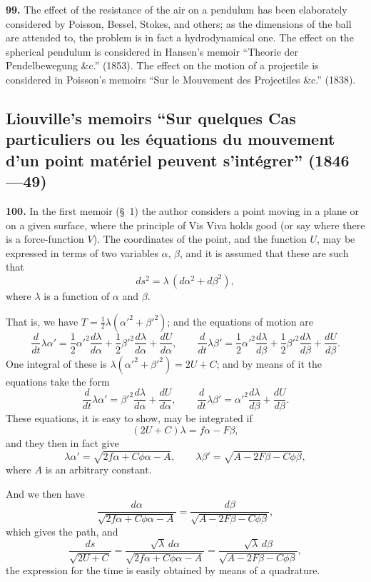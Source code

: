 \documentclass[11pt,a4paper]{book}
\begin{document}
\textbf{99.} The effect of the resistance of the air on a pendulum has been elaborately considered by Poisson, Bessel, Stokes, and others; as the dimensions of the ball are attended to, the problem is in fact a hydrodynamical one. The effect on the spherical pendulum is considered in Hansen's memoir ``Theorie der Pendelbewegung \&c.'' (1853). The effect on the motion of a projectile is considered in Poisson's memoirs ``Sur le Mouvement des Projectiles \&c.'' (1838).

\subsection*{Liouville's memoirs ``Sur quelques Cas particuliers ou les \'equations du mouvement d'un point mat\'eriel peuvent s'int\'egrer'' (1846---49)}

\textbf{100.} In the first memoir (\S~1) the author considers a point moving in a plane or on a given surface, where the principle of Vis Viva holds good (or say where there is a force-function $V$). The coordinates of the point, and the function $U$, may be expressed in terms of two variables $\alpha$, $\beta$, and it is assumed that these are such that
\[
ds^2 = \lambda\,(d\alpha^2 + d\beta^2),
\]
where $\lambda$ is a function of $\alpha$ and $\beta$.

That is, we have $T = \frac{1}{2}\lambda(\alpha'^2 + \beta'^2)$; and the equations of motion are
\[
\frac{d}{dt}\lambda\alpha' = \frac{1}{2}\alpha'^2\frac{d\lambda}{d\alpha} + \frac{1}{2}\beta'^2\frac{d\lambda}{d\alpha} + \frac{dU}{d\alpha}, \qquad
\frac{d}{dt}\lambda\beta' = \frac{1}{2}\alpha'^2\frac{d\lambda}{d\beta} + \frac{1}{2}\beta'^2\frac{d\lambda}{d\beta} + \frac{dU}{d\beta}.
\]
One integral of these is $\lambda(\alpha'^2 + \beta'^2) = 2U + C$; and by means of it the equations take the form
\[
\frac{d}{dt}\lambda\alpha' = \beta'^2\frac{d\lambda}{d\alpha} + \frac{dU}{d\alpha}, \qquad
\frac{d}{dt}\lambda\beta' = \alpha'^2\frac{d\lambda}{d\beta} + \frac{dU}{d\beta}.
\]
These equations, it is easy to show, may be integrated if
\[
(2U + C)\lambda = f\alpha - F\beta,
\]
and they then in fact give
\[
\lambda\alpha' = \sqrt{2f\alpha + C\phi\alpha - A}, \qquad
\lambda\beta' = \sqrt{A - 2F\beta - C\phi\beta},
\]
where $A$ is an arbitrary constant.

And we then have
\[
\frac{d\alpha}{\sqrt{2f\alpha + C\phi\alpha - A}} = \frac{d\beta}{\sqrt{A - 2F\beta - C\phi\beta}},
\]
which gives the path, and
\[
\frac{ds}{\sqrt{2U + C}} = \frac{\sqrt{\lambda}\,d\alpha}{\sqrt{2f\alpha + C\phi\alpha - A}} = \frac{\sqrt{\lambda}\,d\beta}{\sqrt{A - 2F\beta - C\phi\beta}},
\]
the expression for the time is easily obtained by means of a quadrature.
\end{document}
